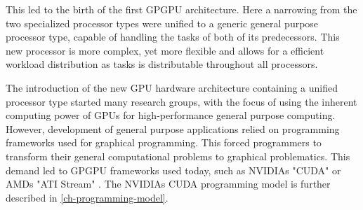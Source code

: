 This led to the birth of the first GPGPU architecture. 
Here a narrowing from the two specialized processor types were unified to a generic general purpose processor type, capable of handling the tasks of both of its predecessors.
This new processor is more complex, yet more flexible and allows for a efficient workload distribution as tasks is distributable throughout all processors.

The introduction of the new GPU hardware architecture containing a unified processor type started many research groups, with the focus of using the inherent computing power of GPUs for high-performance general purpose computing.
However, development of general purpose applications relied on programming frameworks used for graphical programming.
This forced programmers to transform their general computational problems to graphical problematics.
This demand led to GPGPU frameworks used today, such as NVIDIAs "CUDA" or AMDs "ATI Stream" \cite{Johansson2010}.
The NVIDIAs CUDA programming model is further described in \cref{ch-programming-model}.


